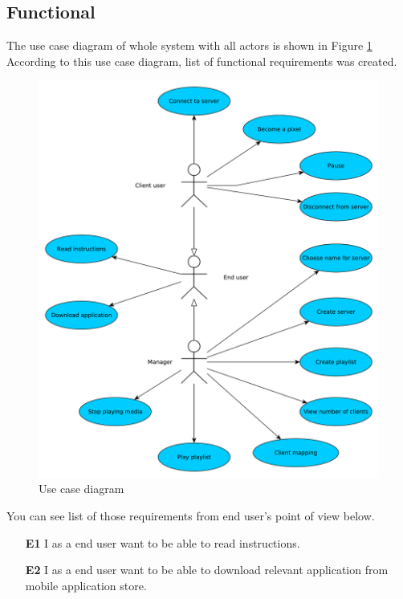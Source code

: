 \subsection{Functional}
The use case diagram of whole system with all actors is shown in Figure \ref{img:usecase}
According to this use case diagram, list of functional requirements was created.

\begin{figure}[h!]
    \begin{center}
    \includegraphics[scale=0.45]{images/usecase.pdf}
    \caption{Use case diagram}
    \label{img:usecase}
    \end{center}
\end{figure}

You can see list of those requirements from end user's point of view below.

\begin{enumerate}
	\item[\textbf{E1}] \label{req_E1}
		I as a end user want to be able to read instructions.
	\item[\textbf{E2}] \label{req_E2}
		I as a end user want to be able to download relevant application from mobile application store.
\end{enumerate}

